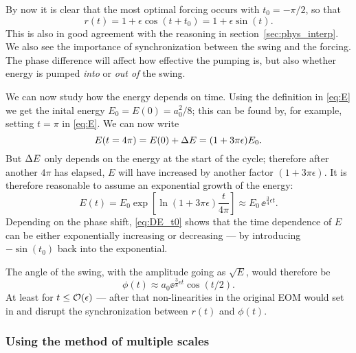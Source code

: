 By now it is clear that the most optimal forcing occurs with
$t_0=-\pi/2$, so that
\begin{equation}\label{eq:r}
r(t)=1+\epsilon\cos(t+t_0)=1+\epsilon\sin(t).
\end{equation}
This is also in good agreement with the reasoning in
section~\ref{sec:phys_interp}. We also see the importance of
synchronization between the swing and the forcing. The phase
difference will affect how effective the pumping is, but also whether
energy is pumped \emph{into} or \emph{out of} the swing.

We can now study how the energy depends on time. Using the
definition in \eqref{eq:E} we get the inital energy $E_0=E(0)=a_0^2/8$; this can be
found by, for example, setting $t=\pi$ in \eqref{eq:E}. We can now write
\begin{equation}\label{eq:E(4pi)}
E(t=4\pi)=E(0)+\Delta{E}=(1+3\pi\epsilon)E_0.
\end{equation}
But $\Delta{E}$ only depends on the energy at the start of the cycle;
therefore after another $4\pi$ has elapsed, $E$ will have increased by
another factor $(1+3\pi\epsilon)$. 
It is therefore reasonable to assume an exponential growth of the
energy: 
\begin{equation}\label{eq:E(t)}
E(t)=E_0\exp[\ln(1+3\pi\epsilon)\frac{t}{4\pi}]
\approx E_0\,\ee^{\frac{3}{4}\epsilon t}.
\end{equation}
Depending on the phase shift, \eqref{eq:DE_t0} shows that the time
dependence of $E$ can be either exponentially increasing or
decreasing --- by introducing $-\!\sin(t_0)$ back into the exponential. 

The angle of the swing, with the amplitude going as
$\sqrt{E}$, would therefore be 
\begin{equation}\label{eq:phi_from_E}
\phi(t)\approx a_0\ee^{\frac{3}{8}\epsilon t}\cos(t/2).
\end{equation}
At least for $t\le\order{\epsilon}$ --- after that non-linearities in the
original EOM would set in and disrupt the synchronization between $r(t)$ and
$\phi(t)$. 



\subsubsection{Using the method of multiple scales}

